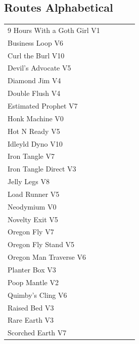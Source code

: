 \begin{flushleft}
\needspace{1.5cm}
\section{Routes Alphabetical}
\begin{center}
\begin{supertabular}{p{0.76\linewidth}p{0.08\linewidth}}
9 Hours With a Goth Girl V1 & \pageref{rt:9 Hours With a Goth Girl} \\
Business Loop V6 & \pageref{rt:Business Loop} \\
Curl the Burl V10 & \pageref{rt:Curl the Burl} \\
Devil's Advocate V5 & \pageref{rt:Devil's Advocate} \\
Diamond Jim V4 & \pageref{rt:Diamond Jim} \\
Double Flush V4 & \pageref{rt:Double Flush} \\
Estimated Prophet V7 & \pageref{rt:Estimated Prophet} \\
Honk Machine V0 & \pageref{rt:Honk Machine} \\
Hot N Ready V5 & \pageref{rt:Hot N Ready} \\
Idleyld Dyno V10 & \pageref{rt:Idleyld Dyno} \\
Iron Tangle V7 & \pageref{rt:Iron Tangle} \\
Iron Tangle Direct V3 & \pageref{rt:Iron Tangle Direct} \\
Jelly Legs V8 & \pageref{rt:Jelly Legs} \\
Load Runner V5 & \pageref{rt:Load Runner} \\
Neodymium V0 & \pageref{rt:Neodymium} \\
Novelty Exit V5 & \pageref{vr:Novelty Exit} \\
Oregon Fly V7 & \pageref{rt:Oregon Fly} \\
Oregon Fly Stand V5 & \pageref{vr:Oregon Fly Stand} \\
Oregon Man Traverse V6 & \pageref{rt:Oregon Man Traverse} \\
Planter Box V3 & \pageref{rt:Planter Box} \\
Poop Mantle V2 & \pageref{rt:Poop Mantle} \\
Quimby's Cling V6 & \pageref{rt:Quimby's Cling} \\
Raised Bed V3 & \pageref{rt:Raised Bed} \\
Rare Earth V3 & \pageref{rt:Rare Earth} \\
Scorched Earth V7 & \pageref{rt:Scorched Earth} \\

\end{supertabular}
\end{center}
\end{flushleft}

